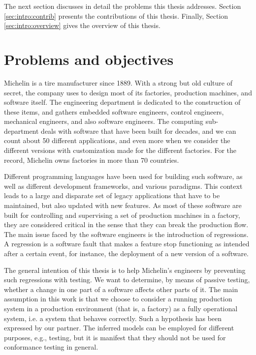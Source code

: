 The next section discusses in detail the problems this thesis
addresses. Section \ref{sec:intro:contrib} presents the
contributions of this thesis. Finally, Section
\ref{sec:intro:overview} gives the overview of this thesis.


\section{Problems and objectives}
\label{sec:intro:problems}

Michelin is a tire manufacturer since 1889. With a strong but old
culture of secret, the company uses to design most of its
factories, production machines, and software itself. The
engineering department is dedicated to the construction of these
items, and gathers embedded software engineers, control
engineers, mechanical engineers, and also software engineers. The
computing sub-department deals with software that have been built
for decades, and we can count about 50 different applications,
and even more when we consider the different versions with
customization made for the different factories. For the record,
Michelin owns factories in more than 70 countries.

Different programming languages have been used for building such
software, as well as different development frameworks, and
various paradigms. This context leads to a large and disparate
set of legacy applications that have to be maintained, but also
updated with new features. As most of these software are built
for controlling and supervising a set of production machines in a
factory, they are considered critical in the sense that they can
break the production flow. The main issue faced by the software
engineers is the introduction of regressions. A regression is a
software fault that makes a feature stop functioning as intended
after a certain event, for instance, the deployment of a new
version of a software.

The general intention of this thesis is to help Michelin's
engineers by preventing such regressions with testing. We want to
determine, by means of passive testing, whether a change in one
part of a software affects other parts of it. The main assumption
in this work is that we choose to consider a running production
system in a production environment (that is, a factory) as a
fully operational system, i.e. a system that behaves correctly.
Such a hypothesis has been expressed by our partner. The
inferred models can be employed for different purposes, e.g.,
testing, but it is manifest that they should not be used for
conformance testing in general.

